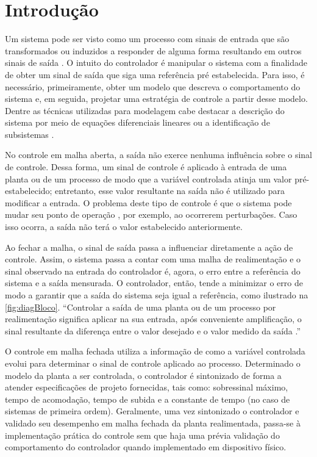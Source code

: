 \chapter{Introdução}

Um sistema pode ser visto como um processo com sinais de entrada que são 
transformados ou induzidos a responder de alguma forma resultando em outros 
sinais de saída \cite{Oppenhein}. O intuito do controlador é manipular o sistema com a 
finalidade de obter um sinal de saída que siga uma referência pré estabelecida. Para isso, 
é necessário, primeiramente, obter um modelo que descreva 
o comportamento do sistema e, em seguida, projetar uma estratégia de controle a 
partir desse modelo. Dentre as técnicas utilizadas para modelagem cabe destacar a 
descrição do sistema por meio de equações diferenciais lineares \cite{Ogata}
ou a identificação de subsistemas \cite{Aguirre}.

No controle em malha aberta, a saída não exerce nenhuma influência sobre o sinal de 
controle. Dessa forma, um sinal de controle é aplicado à entrada de uma planta ou 
de um processo de modo que a variável controlada atinja um valor pré-estabelecido; 
entretanto, esse valor resultante na saída não é utilizado para modificar a entrada. 
O problema deste tipo de controle é que o sistema pode mudar seu ponto de operação
, por exemplo, ao ocorrerem perturbações. Caso isso ocorra, a saída não 
terá o valor estabelecido anteriormente.

Ao fechar a malha, o sinal de saída passa a influenciar diretamente a ação de 
controle. Assim, o sistema passa a contar com uma malha de realimentação e o sinal 
observado na entrada do controlador é, agora, o erro entre a referência do sistema e 
a saída mensurada. O controlador, então, tende a minimizar o erro de modo a garantir 
que a saída do sistema seja igual a referência, como ilustrado na \autoref{fig:diagBloco}.
``Controlar a saída de uma planta ou de um processo por realimentação significa aplicar 
na sua entrada, após conveniente amplificação, o sinal resultante da 
diferença entre o valor desejado e o valor medido da saída \cite[p.~3]{Castrucci}.''

O controle em malha fechada utiliza a informação de como a variável controlada evolui 
para determinar o sinal de controle aplicado ao processo. Determinado o modelo da 
planta a ser controlada, o controlador é sintonizado de forma a atender especificações 
de projeto fornecidas, tais como: sobressinal máximo, tempo de acomodação, tempo de subida
e a constante de tempo (no caso de sistemas de primeira ordem). Geralmente, 
uma vez sintonizado o controlador e validado seu desempenho em malha fechada da 
planta realimentada, passa-se à implementação prática do controle sem que haja 
uma prévia validação do comportamento do controlador quando implementado em 
dispositivo físico.

